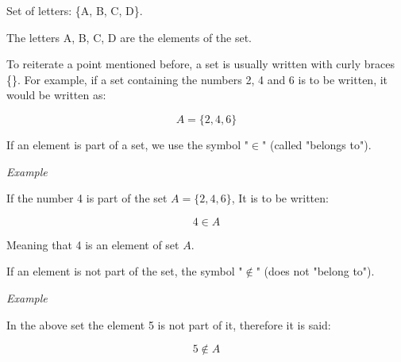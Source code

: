 \documentclass[]{book}
\begin{document}
\vspace{0.5 cm}

\begin{center}
Set of letters: \{A, B, C, D\}.
\end{center}

The letters A, B, C, D are the elements of the set.


To reiterate a point mentioned before, a set is usually written with curly braces \{\}. 
For example, if a set containing the numbers 2, 4 and 6 is to be written, it would be written as: 

$$A = \{2, 4, 6\}$$


\vspace{0.5 cm}
If an element is part of a set, we use the symbol "$\in$" (called "belongs to").

\vspace{0.5 cm}
\textit{Example}

If the number 4 is part of the set $A = \{2, 4, 6\}$, It is to be written:

$$ 4 \in A$$

Meaning that 4 is an element of set $ A$.
 
\vspace{0.5 cm}
If an element is not part of the set, the symbol "$\notin$" (does not "belong to").

\vspace{0.5 cm}
\textit{Example}

In the above set the element 5 is not part of it, therefore it is said:


$$5 \notin A$$
\end{document}
